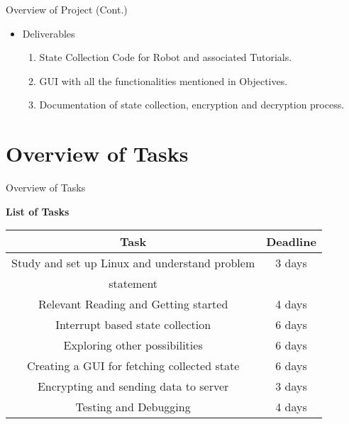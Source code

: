 \documentclass[10pt, a4paper]{beamer}
\begin{document}
\begin{frame}{Overview of Project (Cont.)}
\begin{flushleft}
	\begin{itemize}
        \item Deliverables
            \begin{enumerate}
                \item State Collection Code for Robot and associated Tutorials.
                \item GUI with all the functionalities mentioned in Objectives.
                \item Documentation of state collection, encryption and decryption process.
            \end{enumerate}
    \end{itemize}
\end{flushleft}
\end{frame}

\section{Overview of Tasks}
\begin{frame}{Overview of Tasks}
\begin{flushleft}
 {\Large \bf List of Tasks}\\
 \vspace{0.1in}
\begin{tabular}{|c|c|}
\hline
Task & \hspace{0.1in}Deadline\hspace{0.1in} \\
\hline
Study and set up Linux and understand problem  & 3 days\\
statement &     \\
\hline
Relevant Reading and Getting started &  4 days\\
\hline
Interrupt based state collection & 6 days\\
\hline
Exploring other possibilities & 6 days \\
\hline
Creating a GUI for fetching collected state & 6 days\\
\hline
Encrypting and sending data to server & 3 days\\
\hline
Testing and Debugging & 4 days\\
\hline
\end{tabular}
\end{flushleft}
\end{frame}
\end{document}
